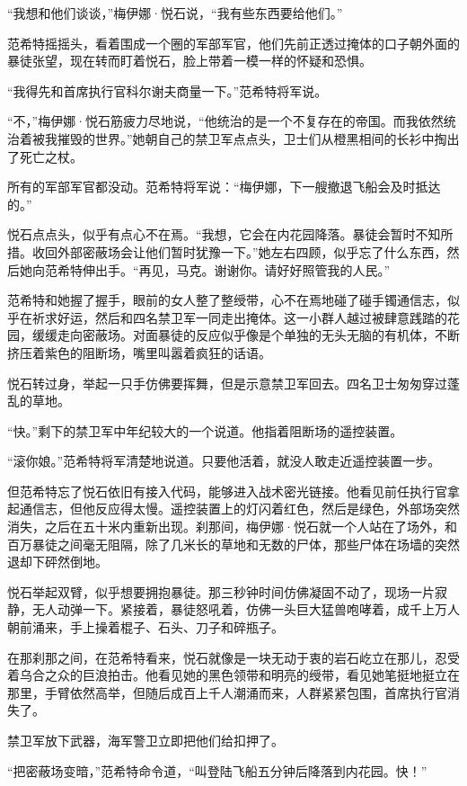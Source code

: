 \documentclass[AutoFakeBold=true]{book}
\begin{document}
``我想和他们谈谈，''梅伊娜·悦石说，``我有些东西要给他们。''

范希特摇摇头，看着围成一个圈的军部军官，他们先前正透过掩体的口子朝外面的暴徒张望，现在转而盯着悦石，脸上带着一模一样的怀疑和恐惧。

``我得先和首席执行官科尔谢夫商量一下。''范希特将军说。

``不，''梅伊娜·悦石筋疲力尽地说，``他统治的是一个不复存在的帝国。而我依然统治着被我摧毁的世界。''她朝自己的禁卫军点点头，卫士们从橙黑相间的长衫中掏出了死亡之杖。

所有的军部军官都没动。范希特将军说：``梅伊娜，下一艘撤退飞船会及时抵达的。''

悦石点点头，似乎有点心不在焉。``我想，它会在内花园降落。暴徒会暂时不知所措。收回外部密蔽场会让他们暂时犹豫一下。''她左右四顾，似乎忘了什么东西，然后她向范希特伸出手。``再见，马克。谢谢你。请好好照管我的人民。''

范希特和她握了握手，眼前的女人整了整绶带，心不在焉地碰了碰手镯通信志，似乎在祈求好运，然后和四名禁卫军一同走出掩体。这一小群人越过被肆意践踏的花园，缓缓走向密蔽场。对面暴徒的反应似乎像是个单独的无头无脑的有机体，不断挤压着紫色的阻断场，嘴里叫嚣着疯狂的话语。

悦石转过身，举起一只手仿佛要挥舞，但是示意禁卫军回去。四名卫士匆匆穿过蓬乱的草地。

``快。''剩下的禁卫军中年纪较大的一个说道。他指着阻断场的遥控装置。

``滚你娘。''范希特将军清楚地说道。只要他活着，就没人敢走近遥控装置一步。

但范希特忘了悦石依旧有接入代码，能够进入战术密光链接。他看见前任执行官拿起通信志，但他反应得太慢。遥控装置上的灯闪着红色，然后是绿色，外部场突然消失，之后在五十米内重新出现。刹那间，梅伊娜·悦石就一个人站在了场外，和百万暴徒之间毫无阻隔，除了几米长的草地和无数的尸体，那些尸体在场墙的突然退却下砰然倒地。

悦石举起双臂，似乎想要拥抱暴徒。那三秒钟时间仿佛凝固不动了，现场一片寂静，无人动弹一下。紧接着，暴徒怒吼着，仿佛一头巨大猛兽咆哮着，成千上万人朝前涌来，手上操着棍子、石头、刀子和碎瓶子。

在那刹那之间，在范希特看来，悦石就像是一块无动于衷的岩石屹立在那儿，忍受着乌合之众的巨浪拍击。他看见她的黑色领带和明亮的绶带，看见她笔挺地挺立在那里，手臂依然高举，但随后成百上千人潮涌而来，人群紧紧包围，首席执行官消失了。

禁卫军放下武器，海军警卫立即把他们给扣押了。

``把密蔽场变暗，''范希特命令道，``叫登陆飞船五分钟后降落到内花园。快！''
\end{document}
